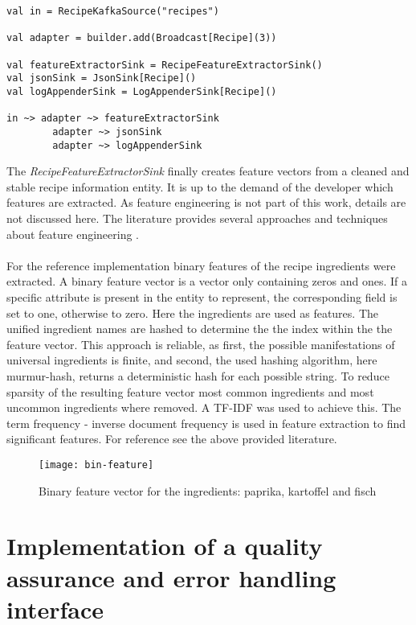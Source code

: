 \begin{lstlisting}[style=myScalastyle,label={lst:output},caption={Example of akka streams graph DSL for splitting streams}]
val in = RecipeKafkaSource("recipes")

val adapter = builder.add(Broadcast[Recipe](3))

val featureExtractorSink = RecipeFeatureExtractorSink()
val jsonSink = JsonSink[Recipe]()
val logAppenderSink = LogAppenderSink[Recipe]()

in ~> adapter ~> featureExtractorSink
        adapter ~> jsonSink
        adapter ~> logAppenderSink
\end{lstlisting}

The \textit{RecipeFeatureExtractorSink} finally creates feature vectors from a cleaned and stable recipe information entity. It is up to the demand of the developer which features are extracted. As feature engineering is not part of this work, details are not discussed here. The literature provides several approaches and techniques about feature engineering \cite{mastering_feature_engineering_2017} \cite{liu_2001}. 
\\\\
For the reference implementation binary features of the recipe ingredients were extracted. A binary feature vector is a vector only containing zeros and ones. If a specific attribute is present in the entity to represent, the corresponding field is set to one, otherwise to zero. Here the ingredients are used as features. The unified ingredient names are hashed to determine the the index within the the feature vector. This approach is reliable, as first, the possible manifestations of universal ingredients is finite, and second, the used hashing algorithm, here murmur-hash, returns a deterministic hash for each possible string. To reduce sparsity of the resulting feature vector most common ingredients and most uncommon ingredients where removed. A TF-IDF was used to achieve this. The term frequency - inverse document frequency is used in feature extraction to find significant features. For reference see the above provided literature.

\begin{figure}[htb]
  \centering
  \texttt{[image: bin-feature]}\\
  \caption{Binary feature vector for the ingredients: paprika, kartoffel and fisch}
  \label{fig:bin-feature}
\end{figure}

\section{Implementation of a quality assurance and error handling interface}

